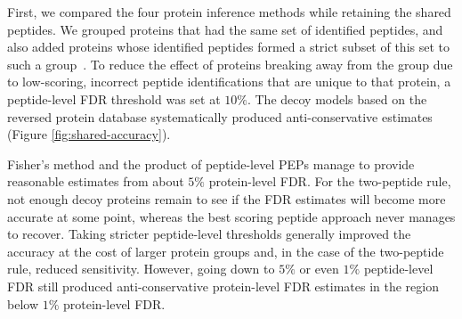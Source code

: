 \documentclass{article}
\begin{document}
First, we compared the four protein inference methods while retaining
the shared peptides. We grouped proteins that had the same set of
identified peptides, and also added proteins whose identified peptides
formed a strict subset of this set to such a
group~\cite{serang2012review}. To reduce the effect of proteins
breaking away from the group due to low-scoring, incorrect peptide
identifications that are unique to that protein, a peptide-level FDR
threshold was set at $10\%$. The decoy models based on the reversed
protein database systematically produced anti-conservative estimates
(Figure \ref{fig:shared-accuracy}).

Fisher's method and the product of peptide-level PEPs manage to
provide reasonable estimates from about $5\%$ protein-level FDR. For
the two-peptide rule, not enough decoy proteins remain to see if the
FDR estimates will become more accurate at some point, whereas the
best scoring peptide approach never manages to recover. Taking
stricter peptide-level thresholds generally improved the accuracy at
the cost of larger protein groups and, in the case of the two-peptide
rule, reduced sensitivity. However, going down to $5\%$ or even $1\%$
peptide-level FDR still produced anti-conservative protein-level FDR
estimates in the region below $1\%$ protein-level FDR.
\end{document}
